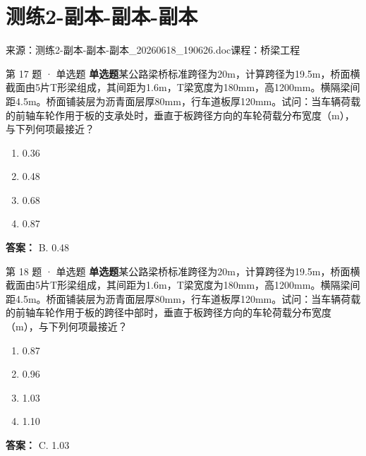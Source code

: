 \documentclass[UTF8,zihao=-4,openany]{ctexbook}
\newenvironment{choices}{\begin{enumerate}[label=\Alph*.,leftmargin=9mm,labelsep=3mm,itemsep=2pt,topsep=4pt]}{\end{enumerate}}
\newcommand{\qtype}[1]{\textcolor{brand}{\sffamily\bfseries #1}}
\newcommand{\sourcefile}[1]{\textcolor{muted}{\small\sffamily 来源：#1}}
\begin{document}
\chapter{测练2-副本-副本-副本}

\sourcefile{测练2-副本-副本-副本\_20260618\_190626.doc}\quad \textcolor{muted}{\small\sffamily 课程：桥梁工程}

\begin{questionbox}{第 17 题 · 单选题}
\qtype{单选题}\quad 某公路梁桥标准跨径为20m，计算跨径为19.5m，桥面横截面由5片T形梁组成，其间距为1.6m，T梁宽度为180mm，高1200mm。横隔梁间距4.5m。桥面铺装层为沥青面层厚80mm，行车道板厚120mm。试问：当车辆荷载的前轴车轮作用于板的支承处时，垂直于板跨径方向的车轮荷载分布宽度（m），与下列何项最接近？
\begin{choices}
\item 0.36
\item 0.48
\item 0.68
\item 0.87
\end{choices}
\begin{answerbox}
\textbf{答案：} B. 0.48
\end{answerbox}
\end{questionbox}

\begin{questionbox}{第 18 题 · 单选题}
\qtype{单选题}\quad 某公路梁桥标准跨径为20m，计算跨径为19.5m，桥面横截面由5片T形梁组成，其间距为1.6m，T梁宽度为180mm，高1200mm。横隔梁间距4.5m。桥面铺装层为沥青面层厚80mm，行车道板厚120mm。试问：当车辆荷载的前轴车轮作用于板的跨径中部时，垂直于板跨径方向的车轮荷载分布宽度（m），与下列何项最接近？
\begin{choices}
\item 0.87
\item 0.96
\item 1.03
\item 1.10
\end{choices}
\begin{answerbox}
\textbf{答案：} C. 1.03
\end{answerbox}
\end{questionbox}
\end{document}
